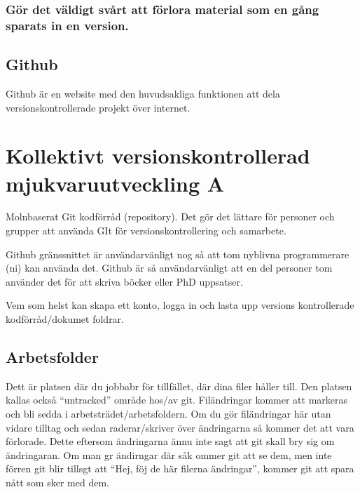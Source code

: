 \documentclass[
  letterpaper,
  DIV=11,
  numbers=noendperiod]{scrreprt}
\begin{document}
\subsection{Gör det väldigt svårt att förlora material som en gång
sparats in en
version.}\label{guxf6r-det-vuxe4ldigt-svuxe5rt-att-fuxf6rlora-material-som-en-guxe5ng-sparats-in-en-version.}

\section{Github}\label{github}

Github är en website med den huvudsakliga funktionen att dela
versionskontrollerade projekt över internet.


\chapter{Kollektivt versionskontrollerad mjukvaruutveckling
A}\label{kollektivt-versionskontrollerad-mjukvaruutveckling-a}

Molnbaserat Git kodförråd (repository). Det gör det lättare för personer
och grupper att använda GIt för versionskontrollering och samarbete.

Github gränssnittet är användarvänligt nog så att tom nyblivna
programmerare (ni) kan använda det. Github är så användarvänligt att en
del personer tom använder det för att skriva böcker eller PhD uppsatser.

Vem som helst kan skapa ett konto, logga in och lasta upp versions
kontrollerade kodförråd/dokumet foldrar.

\section{Arbetsfolder}\label{arbetsfolder}

Dett är platsen där du jobbabr för tillfället, där dina filer håller
till. Den platsen kallas också ``untracked'' område hos/av git.
Filändringar kommer att markeras och bli sedda i
arbetsträdet/arbetsfoldern. Om du gör filändringar här utan vidare
tilltag och sedan raderar/skriver över ändringarna så kommer det att
vara förlorade. Dette eftersom ändringarna ännu inte sagt att git skall
bry sig om ändringaran. Om man gr ändirngar där såk ommer git att se
dem, men inte förren git blir tillsgt att ``Hej, föj de här filerna
ändringar'', kommer git att spara nått som sker med dem.
\end{document}

